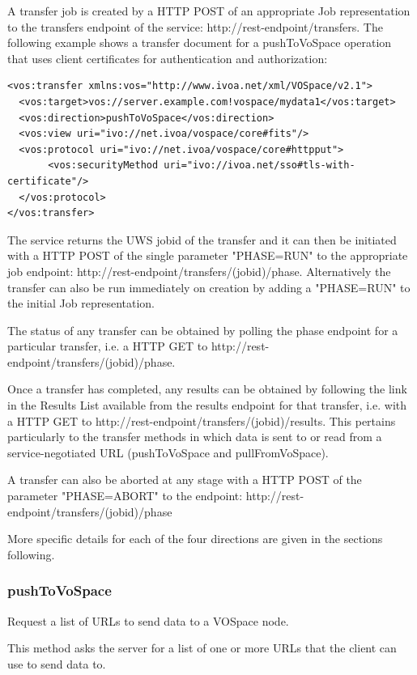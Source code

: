 \documentclass[11pt,a4paper]{ivoa}
\begin{document}
A transfer job is created by a HTTP POST of an appropriate Job representation to the transfers endpoint of the service: http://rest-endpoint/transfers.  The following example shows a transfer document for a pushToVoSpace operation that uses client certificates for authentication and authorization:

\begin{lstlisting}
<vos:transfer xmlns:vos="http://www.ivoa.net/xml/VOSpace/v2.1">   
  <vos:target>vos://server.example.com!vospace/mydata1</vos:target>
  <vos:direction>pushToVoSpace</vos:direction>
  <vos:view uri="ivo://net.ivoa/vospace/core#fits"/>
  <vos:protocol uri="ivo://net.ivoa/vospace/core#httpput">
       <vos:securityMethod uri="ivo://ivoa.net/sso#tls-with-certificate"/>
  </vos:protocol>
</vos:transfer>
\end{lstlisting}

The service returns the UWS jobid of the transfer and it can then be initiated with a HTTP POST of the single parameter "PHASE=RUN" to the appropriate job endpoint: http://rest-endpoint/transfers/(jobid)/phase. Alternatively the transfer can also be run immediately on creation by adding a "PHASE=RUN" to the initial Job representation.

The status of any transfer can be obtained by polling the phase endpoint for a particular transfer, i.e. a HTTP GET to http://rest-endpoint/transfers/(jobid)/phase.

Once a transfer has completed, any results can be obtained by following the link in the Results List available from the results endpoint for that transfer, i.e. with a HTTP GET to http://rest-endpoint/transfers/(jobid)/results. This pertains particularly to the transfer methods in which data is sent to or read from a service-negotiated URL (pushToVoSpace and pullFromVoSpace).

A transfer can also be aborted at any stage with a HTTP POST of the parameter "PHASE=ABORT" to the endpoint: http://rest-endpoint/transfers/(jobid)/phase

More specific details for each of the four directions are given in the sections following.

\subsubsection{pushToVoSpace}
\label{subsubsec:pushtovospace}
Request a list of URLs to send data to a VOSpace node.

This method asks the server for a list of one or more URLs that the client can use to send data to.
\end{document}
